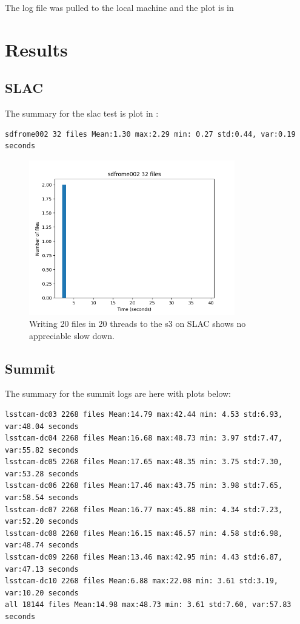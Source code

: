 The log file was pulled to the local machine and the plot is in 

\section{Results}
\subsection{SLAC } \label{sec:s3df}

The summary for the slac test is plot in  :
\begin{verbatim}
sdfrome002 32 files Mean:1.30 max:2.29 min: 0.27 std:0.44, var:0.19 seconds
\end{verbatim}

\begin{figure}
\begin{centering}
\includegraphics[width=0.8\textwidth]{plots/sdfrome002}
	\caption{Writing 20 files in 20 threads to the s3 on SLAC shows no appreciable slow down.
\label{fig:slac}}
\end{centering}
\end{figure}

\subsection{Summit } \label{sec:summit}

The summary for the summit logs are here with plots below:
\begin{verbatim}
lsstcam-dc03 2268 files Mean:14.79 max:42.44 min: 4.53 std:6.93, var:48.04 seconds
lsstcam-dc04 2268 files Mean:16.68 max:48.73 min: 3.97 std:7.47, var:55.82 seconds
lsstcam-dc05 2268 files Mean:17.65 max:48.35 min: 3.75 std:7.30, var:53.28 seconds
lsstcam-dc06 2268 files Mean:17.46 max:43.75 min: 3.98 std:7.65, var:58.54 seconds
lsstcam-dc07 2268 files Mean:16.77 max:45.88 min: 4.34 std:7.23, var:52.20 seconds
lsstcam-dc08 2268 files Mean:16.15 max:46.57 min: 4.58 std:6.98, var:48.74 seconds
lsstcam-dc09 2268 files Mean:13.46 max:42.95 min: 4.43 std:6.87, var:47.13 seconds
lsstcam-dc10 2268 files Mean:6.88 max:22.08 min: 3.61 std:3.19, var:10.20 seconds
all 18144 files Mean:14.98 max:48.73 min: 3.61 std:7.60, var:57.83 seconds
\end{verbatim}


